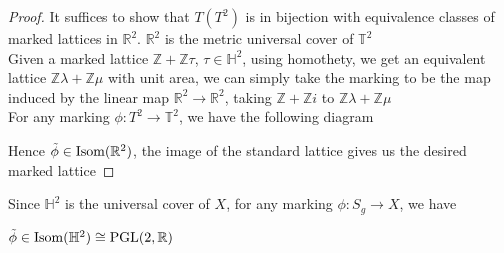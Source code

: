 \documentclass[main]{subfiles}
\begin{document}
\begin{proof}
It suffices to show that $T(T^2)$ is in bijection with equivalence classes of marked lattices in $\mathbb R^2$. $\mathbb R^2$ is the metric universal cover of $\mathbb T^2$ \\
Given a marked lattice $\mathbb Z+\mathbb Z\tau$, $\tau\in\mathbb H^2$, using homothety, we get an equivalent lattice $\mathbb Z\lambda+\mathbb Z\mu$ with unit area, we can simply take the marking to be the map induced by the linear map $\mathbb R^2\to\mathbb R^2$, taking $\mathbb Z+\mathbb Z i$ to $\mathbb Z\lambda+\mathbb Z\mu$ \\
For any marking $\phi:T^2\to\mathbb T^2$, we have the following diagram
\begin{center}
\end{center}
Hence $\tilde\phi\in\operatorname{Isom}(\mathbb R^2)$, the image of the standard lattice gives us the desired marked lattice
\end{proof}

Since $\mathbb H^2$ is the universal cover of $X$, for any marking $\phi:S_g\to X$, we have
\begin{center}
\end{center}
$\tilde\phi\in\operatorname{Isom}(\mathbb H^2)\cong\operatorname{PGL}(2,\mathbb R)$
\end{document}

